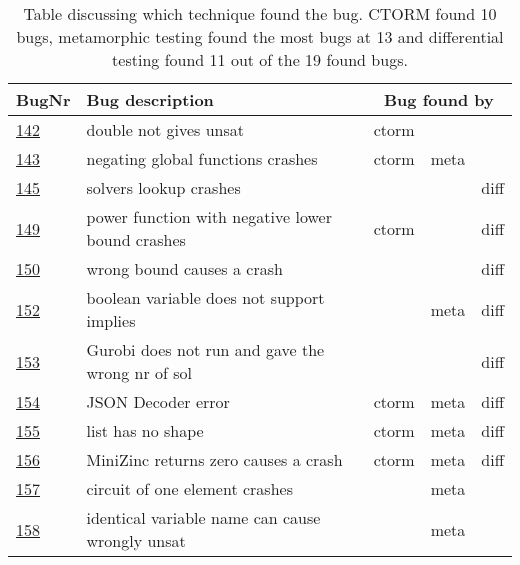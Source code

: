 \begin{table}[]
	\centering
	\caption{Table discussing which technique found the bug. CTORM found 10 bugs, metamorphic testing found the most bugs at 13 and differential testing found 11 out of the 19 found bugs.}
	\label{tab:bug:Technique}
	\begin{tabular}{lllll}
		\hline
		BugNr & Bug description                                           & \multicolumn{3}{c}{\centering  Bug found by} \\ \toprule
		\href{https://github.com/CPMpy/cpmpy/issues/142}{142} & double not gives unsat                            & ctorm &       &      \\
		\href{https://github.com/CPMpy/cpmpy/issues/143}{143} & negating global functions crashes                 & ctorm & meta  &      \\
		\href{https://github.com/CPMpy/cpmpy/issues/145}{145} & solvers lookup crashes                            &       &       & diff \\
		\href{https://github.com/CPMpy/cpmpy/issues/149}{149} & power function with negative lower bound crashes  & ctorm &       & diff \\
		\href{https://github.com/CPMpy/cpmpy/issues/150}{150} & wrong bound causes a crash                  &       &       & diff \\
		\href{https://github.com/CPMpy/cpmpy/issues/152}{152} & boolean variable does not support implies         &       & meta  & diff \\
		\href{https://github.com/CPMpy/cpmpy/issues/153}{153} & Gurobi does not run and gave the wrong nr of sol  &       &       & diff \\
		\href{https://github.com/CPMpy/cpmpy/issues/154}{154} & JSON Decoder error                                & ctorm & meta  & diff \\
		\href{https://github.com/CPMpy/cpmpy/issues/155}{155} & list has no shape                                 & ctorm & meta  & diff \\
		\href{https://github.com/CPMpy/cpmpy/issues/156}{156} & MiniZinc returns zero causes a crash              & ctorm & meta  & diff \\
		\href{https://github.com/CPMpy/cpmpy/issues/157}{157} & circuit of one element crashes                    &       & meta  &      \\
		\href{https://github.com/CPMpy/cpmpy/issues/158}{158} & identical variable name can cause wrongly unsat   &       & meta  &      \\

\end{tabular}
\end{table}
